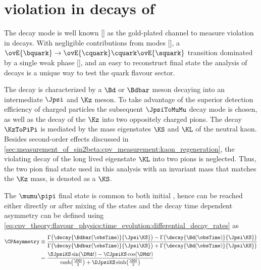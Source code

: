 
\section[
  head={\CP violation in decays of \BdToJpsiKS},
  tocentry={\CPHyperref violation in decays of \BdToJpsiKSHyperref}
]{\CPbfsf violation in decays of \BdToJpsiKSbfsf}
\label{sec:cpv_theory:bd2jpsiks}

The decay mode \BdToJpsiKS is well known [] as the gold-plated channel to measure
\CP violation in \Bd decays. With negligible contributions from \DCS
modes [], a $\ovE{\bquark}\to\ovE{\cquark}\cquark\ovE{\squark}$ transition
dominated by a single weak phase [], and an easy to reconstruct final state the
analysis of \BdToJpsiKS decays is a unique way to test the \SM quark flavour
sector.


The decay is characterized by a $\Bd$ or $\Bdbar$ meson decaying into an
intermediate $\Jpsi$ and $\Kz$ meson. To take advantage of the superior
detection efficiency of charged particles the subsequent $\JpsiToMuMu$ decay
mode is chosen, as well as the decay of the $\Kz$ into two oppositely charged
pions. The decay $\KzToPiPi$ is mediated by the mass eigenstates $\KS$ and $\KL$
of the neutral kaon. Besides second-order effects discussed in
\cref{sec:measurement_of_sin2beta:cpv_measurement:kaon_regeneration}, the \CP
violating decay of the long lived eigenstate $\KL$ into two pions is neglected.
Thus, the two pion final state used in this analysis with an invariant mass that
matches the $\Kz$ mass, is denoted as a $\KS$. 

The $\mumu\pipi$ final state is common to both initial \Bmesons, hence can be
reached either directly or after mixing of the \Bmeson states and the decay time
dependent \CP asymmetry \CPAsymmetry can be defined using
\cref{eq:cpv_theory:flavour_physics:time_evolution:differential_decay_rates} as
%
\begin{equation}\label{eq:cpv_theory:bd2jpsiks:cp_asymmetry}
  \begin{split}
    \CPAsymmetry &\equiv 
      \frac{\Gamma\bigl(\decay{\Bdbar(\obsTime)}{\Jpsi\KS}\bigr) - \Gamma\bigl(\decay{\Bd(\obsTime)}{\Jpsi\KS}\bigr)}
           {\Gamma\bigl(\decay{\Bdbar(\obsTime)}{\Jpsi\KS}\bigr) + \Gamma\bigl(\decay{\Bd(\obsTime)}{\Jpsi\KS}\bigr)} \\
                 &= \frac{\SJpsiKS\sin(\DMd t) - \CJpsiKS\cos(\DMd t)}{\cosh\bigl(\frac{\DG t}{2}\bigr) + \DJpsiKS\sinh\bigl(\frac{\DG t}{2}\bigr)}
  \end{split}
\end{equation}
%


